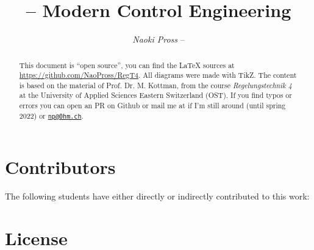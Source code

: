 \documentclass[margin=small]{tex/hsrzf}
\author{\textsl{Naoki Pross} -- \texttt{\theauthoremail}}
\title{\texttt{\themodule} -- Modern Control Engineering}
\date{\thesemester}
\begin{document}

\maketitle

\begin{abstract}
  This document is ``open source'', you can find the \LaTeX{} sources at \url{https://github.com/NaoPross/RegT4}. All diagrams were made with TikZ.  The content is based on the material of Prof. Dr. M. Kottman, from the course \emph{Regelungstechnik 4} at the University of Applied Sciences Eastern Switzerland (OST). If you find typos or errors you can open an PR on Github or mail me at \href{mailto:\theauthoremail}{\texttt{\theauthoremail}} if I'm still around (until spring 2022) or \href{mailto:np@0hm.ch}{\texttt{np@0hm.ch}}.
\end{abstract}

\section*{Contributors}

The following students have either directly or indirectly contributed to this work: \thecontributors

\section*{License}
\doclicenseThis

\tableofcontents

\clearpage
\twocolumn

\setcounter{page}{1}





\appendix






\onecolumn

\end{document}
